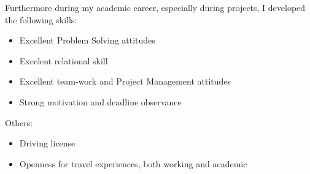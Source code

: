 \vspace{0.5em}
Furthermore during my academic career, especially during projects, I developed the following skills:
\begin{itemize}
	\item Excellent Problem Solving attitudes
	\item Excelent relational skill
	\item Excellent team-work and Project Management attitudes
	\item Strong motivation and deadline observance
\end{itemize}
Others:
\begin{itemize}
	\item Driving license
	\item Openness for travel experiences, both working and academic
\end{itemize}
